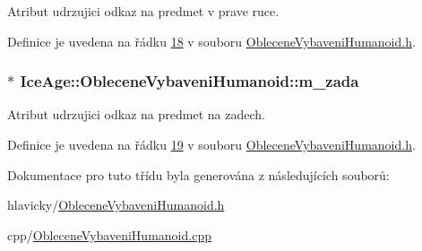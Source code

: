Atribut udrzujici odkaz na predmet v prave ruce. 



Definice je uvedena na řádku \hyperlink{ObleceneVybaveniHumanoid_8h_source_l00018}{18} v souboru \hyperlink{ObleceneVybaveniHumanoid_8h_source}{Oblecene\+Vybaveni\+Humanoid.\+h}.

\subsubsection[{\texorpdfstring{m\+\_\+zada}{m_zada}}]{$\ast$ Ice\+Age\+::\+Oblecene\+Vybaveni\+Humanoid\+::m\+\_\+zada\hspace{0.3cm}{\ttfamily [protected]}}\hypertarget{classIceAge_1_1ObleceneVybaveniHumanoid_a1dc766d8630d59c3690be0ea73848554}{}\label{classIceAge_1_1ObleceneVybaveniHumanoid_a1dc766d8630d59c3690be0ea73848554}


Atribut udrzujici odkaz na predmet na zadech. 



Definice je uvedena na řádku \hyperlink{ObleceneVybaveniHumanoid_8h_source_l00019}{19} v souboru \hyperlink{ObleceneVybaveniHumanoid_8h_source}{Oblecene\+Vybaveni\+Humanoid.\+h}.



Dokumentace pro tuto třídu byla generována z následujících souborů\+:\begin{DoxyCompactItemize}
\item 
hlavicky/\hyperlink{ObleceneVybaveniHumanoid_8h}{Oblecene\+Vybaveni\+Humanoid.\+h}\item 
cpp/\hyperlink{ObleceneVybaveniHumanoid_8cpp}{Oblecene\+Vybaveni\+Humanoid.\+cpp}\end{DoxyCompactItemize}
